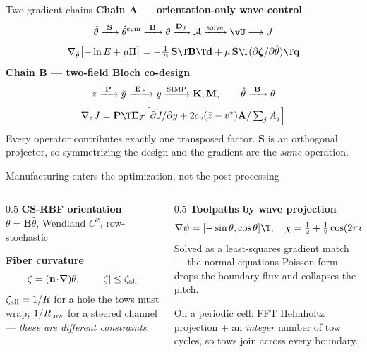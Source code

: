 \documentclass[aspectratio=169,10pt]{beamer}
\begin{document}
\begin{frame}{Two gradient chains}
\textbf{Chain A --- orientation-only wave control}
\[
  \hat\theta\xrightarrow{\ \mathbf S\ }\hat\theta^{\rm sym}
  \xrightarrow{\ \mathbf B\ }\theta
  \xrightarrow{\mathbf D_f}\mathcal A
  \xrightarrow{\rm solve}\vU\longrightarrow J
\]
\[
  \nabla_{\hat\theta}\bigl[-\ln E+\mu\Pi\bigr]
  =-\tfrac{1}{E}\,\mathbf S\T\mathbf B\T\mathbf d
  +\mu\,\mathbf S\T(\partial\bm\zeta/\partial\hat\theta)\T\mathbf q
\]
\medskip
\textbf{Chain B --- two-field Bloch co-design}
\[
  z\xrightarrow{\ \mathbf P\ }\tilde y\xrightarrow{\ \mathbf E_{\mathcal F}\ }y
  \xrightarrow{\rm SIMP}\mathbf K,\mathbf M,
  \qquad
  \hat\theta\xrightarrow{\ \mathbf B\ }\theta
\]
\[
  \nabla_zJ=\mathbf P\T\mathbf E_{\mathcal F}\Bigl[\partial J/\partial y+2c_v(\bar z-v^\star)\mathbf A/\textstyle\sum_jA_j\Bigr]
\]
\vfill
Every operator contributes exactly one transposed factor. $\mathbf S$ is an
orthogonal projector, so symmetrizing the design and the gradient are the
\emph{same} operation.
\end{frame}

\begin{frame}{Manufacturing enters the optimization, not the post-processing}
\begin{columns}[T]
\begin{column}{0.5\textwidth}
\textbf{CS-RBF orientation}\\
$\theta=\mathbf B\hat\theta$, Wendland $C^2$, row-stochastic
\medskip

\textbf{Fiber curvature}
\[
  \zeta=(\mathbf n\!\cdot\!\nabla)\theta,\qquad |\zeta|\le\zeta_{\rm all}
\]
$\zeta_{\rm all}=1/R$ for a hole the tows must wrap;
$1/R_{\rm tow}$ for a steered channel --- \emph{these are different constraints}.
\end{column}
\begin{column}{0.5\textwidth}
\textbf{Toolpaths by wave projection}
\[
  \nabla\psi=[-\sin\theta,\cos\theta]\T,\quad
  \chi=\tfrac12+\tfrac12\cos(2\pi\psi/d)
\]
Solved as a least-squares gradient match --- the normal-equations Poisson form
drops the boundary flux and collapses the pitch.
\medskip

On a periodic cell: FFT Helmholtz projection $+$ an \emph{integer} number of tow
cycles, so tows join across every boundary.
\end{column}
\end{columns}
\end{frame}
\end{document}

